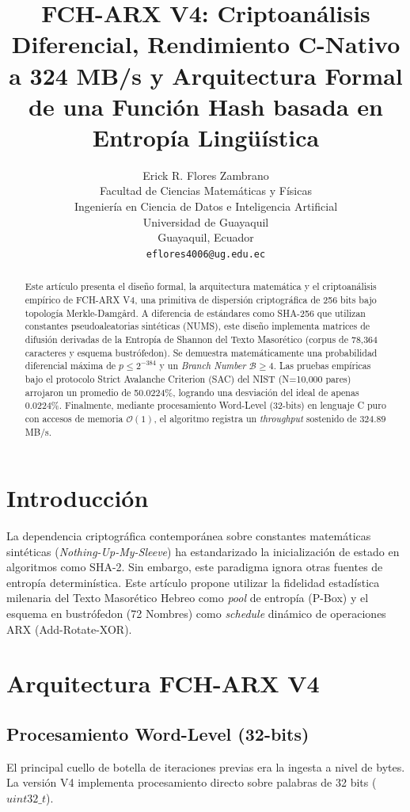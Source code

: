 \documentclass[10pt,twocolumn,letterpaper]{article}
\title{\LARGE \bf
FCH-ARX V4: Criptoanálisis Diferencial, Rendimiento C-Nativo a 324 MB/s y Arquitectura Formal de una Función Hash basada en Entropía Lingüística
}
\author{
Erick R. Flores Zambrano\\
Facultad de Ciencias Matemáticas y Físicas\\
Ingeniería en Ciencia de Datos e Inteligencia Artificial\\
Universidad de Guayaquil\\
Guayaquil, Ecuador\\
{\tt\small eflores4006@ug.edu.ec}
}
\begin{document}
\maketitle
\thispagestyle{empty}

\begin{abstract}
Este artículo presenta el diseño formal, la arquitectura matemática y el criptoanálisis empírico de FCH-ARX V4, una primitiva de dispersión criptográfica de 256 bits bajo topología Merkle-Damgård. A diferencia de estándares como SHA-256 que utilizan constantes pseudoaleatorias sintéticas (NUMS), este diseño implementa matrices de difusión derivadas de la Entropía de Shannon del Texto Masorético (corpus de 78,364 caracteres y esquema bustrófedon). Se demuestra matemáticamente una probabilidad diferencial máxima de $p \leq 2^{-384}$ y un \textit{Branch Number} $\mathcal{B} \geq 4$. Las pruebas empíricas bajo el protocolo Strict Avalanche Criterion (SAC) del NIST (N=10,000 pares) arrojaron un promedio de 50.0224\%, logrando una desviación del ideal de apenas 0.0224\%. Finalmente, mediante procesamiento Word-Level (32-bits) en lenguaje C puro con accesos de memoria $\mathcal{O}(1)$, el algoritmo registra un \textit{throughput} sostenido de $324.89$ MB/s.
\end{abstract}

\section{Introducción}

La dependencia criptográfica contemporánea sobre constantes matemáticas sintéticas (\textit{Nothing-Up-My-Sleeve}) ha estandarizado la inicialización de estado en algoritmos como SHA-2. Sin embargo, este paradigma ignora otras fuentes de entropía determinística. Este artículo propone utilizar la fidelidad estadística milenaria del Texto Masorético Hebreo como \textit{pool} de entropía (P-Box) y el esquema en bustrófedon (72 Nombres) como \textit{schedule} dinámico de operaciones ARX (Add-Rotate-XOR).

\section{Arquitectura FCH-ARX V4}

\subsection{Procesamiento Word-Level (32-bits)}
El principal cuello de botella de iteraciones previas era la ingesta a nivel de bytes. La versión V4 implementa procesamiento directo sobre palabras de 32 bits ($uint32\_t$).
\end{document}
